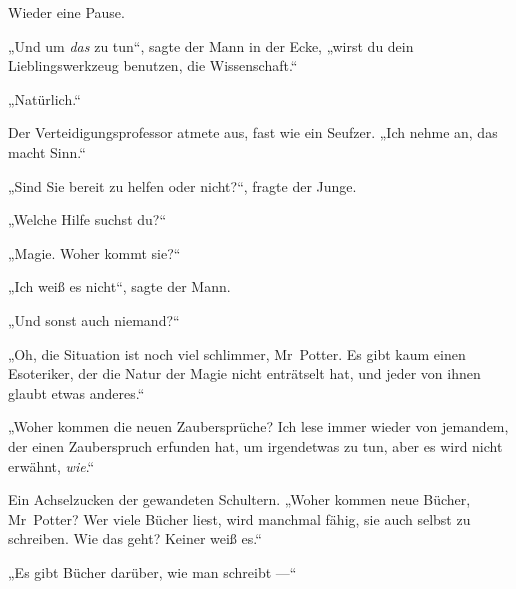 Wieder eine Pause.

„Und um \emph{das} zu tun“, sagte der Mann in der Ecke, „wirst du dein Lieblingswerkzeug benutzen, die Wissenschaft.“

„Natürlich.“

Der Verteidigungsprofessor atmete aus, fast wie ein Seufzer.
„Ich nehme an, das macht Sinn.“

„Sind Sie bereit zu helfen oder nicht?“, fragte der Junge.

„Welche Hilfe suchst du?“

„Magie. Woher kommt sie?“

„Ich weiß es nicht“, sagte der Mann.

„Und sonst auch niemand?“

„Oh, die Situation ist noch viel schlimmer, Mr~Potter. Es gibt kaum einen Esoteriker, der die Natur der Magie nicht enträtselt hat, und jeder von ihnen glaubt etwas anderes.“

„Woher kommen die neuen Zaubersprüche? Ich lese immer wieder von jemandem, der einen Zauberspruch erfunden hat, um irgendetwas zu tun, aber es wird nicht erwähnt, \emph{wie}.“

Ein Achselzucken der gewandeten Schultern.
„Woher kommen neue Bücher, Mr~Potter? Wer viele Bücher liest, wird manchmal fähig, sie auch selbst zu schreiben. Wie das geht? Keiner weiß es.“

„Es gibt Bücher darüber, wie man schreibt —“

